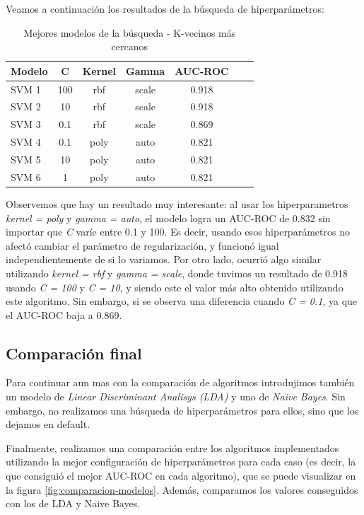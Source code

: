 Veamos a continuación los resultados de la búsqueda de hiperparámetros:

\begin{table}[H]
    \centering
    \begin{tabular}{|l|c|c|c|c|c|c|}
    \hline
    \textbf{Modelo} & \textbf{C} & \textbf{Kernel} & \textbf{Gamma} & \textbf{AUC-ROC} \\
    \hline
    \rowcolor{yellow!30}
    SVM 1 & 100 & rbf & scale & 0.918 \\
    SVM 2 & 10 & rbf & scale & 0.918 \\
    SVM 3 & 0.1 & rbf & scale & 0.869 \\
    SVM 4 & 0.1 & poly & auto & 0.821 \\
    SVM 5 & 10 & poly & auto & 0.821 \\
    SVM 6 & 1 & poly & auto & 0.821 \\
    \hline
    \end{tabular}
    \caption*{Mejores modelos de la búsqueda - K-vecinos más cercanos}
    \label{tab:hiperparametros-knn-tabla}
\end{table}

Observemos que hay un resultado muy interesante: al usar los hiperparametros \textit{kernel = poly} y \textit{gamma = auto},
el modelo logra un AUC-ROC de 0.832 sin importar que \textit{C} varíe entre 0.1 y 100. Es decir, usando esos hiperparámetros
no afectó cambiar el parámetro de regularización, y funcionó igual independientemente de si lo variamos.
Por otro lado, ocurrió algo similar utilizando \textit{kernel = rbf} y \textit{gamma = scale}, donde tuvimos un resultado de 
0.918 usando \textit{C = 100} y \textit{C = 10}, y siendo este el valor más alto obtenido utilizando este algoritmo. Sin embargo,
si se observa una diferencia cuando \textit{C = 0.1}, ya que el AUC-ROC baja a 0.869.

\subsection*{Comparación final}

Para continuar aun mas con la comparación de algoritmos introdujimos también un modelo de \textit{Linear Discriminant Analisys (LDA)} y uno de \textit{Naive Bayes}.
Sin embargo, no realizamos una búsqueda de hiperparámetros para ellos, sino que los dejamos en default.

Finalmente, realizamos una comparación entre los algoritmos implementados utilizando la mejor configuración de hiperparámetros
para cada caso (es decir, la que consiguió el mejor AUC-ROC en cada algoritmo), que se puede visualizar en la figura \ref{fig:comparacion-modelos}. Además, comparamos los valores conseguidos
con los de LDA y Naive Bayes. 

